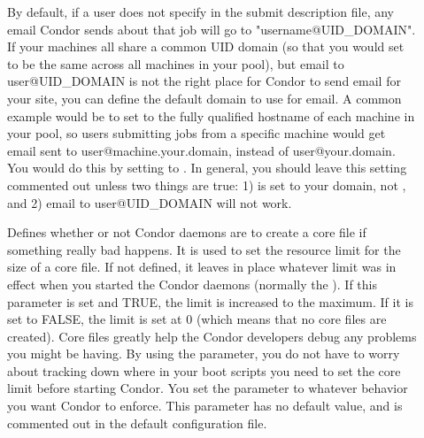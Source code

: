 \begin{description}
\item[] \label{param:EmailDomain}
  By default, if a user does not specify  in the
  submit description file, any email Condor sends about that job will
  go to "username@UID\_DOMAIN".
  If your machines all share a common UID domain (so that you would
  set  to be the same across all machines in your
  pool), but email to user@UID\_DOMAIN is not the right place for
  Condor to send email for your site, you can define the default
  domain to use for email.
  A common example would be to set  to the fully
  qualified hostname of each machine in your pool, so users submitting
  jobs from a specific machine would get email sent to
  user@machine.your.domain, instead of user@your.domain.  
  You would do this by setting  to
  . 
  In general, you should leave this setting commented out unless two
  things are true: 1)  is set to your domain, not
  , and 2) email to user@UID\_DOMAIN will not 
  work. 
 
\item[] \label{param:CreateCoreFiles}
  Defines whether or not Condor daemons are to
  create a core file if something really bad happens.  It is
  used to set
  the resource limit for the size of a core file.  If not defined,
  it leaves in place whatever limit was in effect
  when you started the Condor daemons (normally the ).
  If this parameter is set and TRUE, the limit is increased to
  the maximum.  If it is set to FALSE, the limit is set at 0
  (which means that no core files are created).  Core files
  greatly help the Condor developers debug any problems you might be
  having.  By using the parameter, you do not have to worry about
  tracking down where in your boot scripts you need to set the core
  limit before starting Condor. You set the parameter
  to whatever behavior you want Condor to enforce.  This parameter has
  no default value, and is commented out in the default configuration file. 


\end{description}
